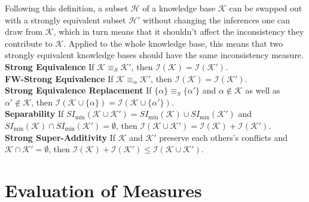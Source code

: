 Following this definition, a subset \(\mathcal{H}\) of a knowledge base \(\mathcal{K}\) can be swapped out with a strongly equivalent subset \(\mathcal{H}'\) without changing the inferences one can draw from \(\mathcal{K}\), which in turn means that it shouldn't affect the inconsistency they contribute to \(\mathcal{K}\). Applied to the whole knowledge base, this means that two strongly equivalent knowledge bases should have the same inconsistency measure.
\\
\textbf{Strong Equivalence}
If \(\mathcal{K} \equiv_S \mathcal{K}'\), then \(\mathcal{I}(\mathcal{K}) = \mathcal{I}(\mathcal{K}')\).
\\
\textbf{FW-Strong Equivalence}
If \(\mathcal{K} \equiv_{\alpha} \mathcal{K}'\), then \(\mathcal{I}(\mathcal{K}) = \mathcal{I}(\mathcal{K}')\).
\\
\textbf{Strong Equivalence Replacement}
If \(\{\alpha\} \equiv_S \{\alpha'\}\) and \(\alpha \notin \mathcal{K}\) as well as \(\alpha' \notin \mathcal{K}\), then \(\mathcal{I}(\mathcal{K} \cup \{\alpha\}) = \mathcal{I}(\mathcal{K} \cup \{\alpha'\})\).
\\
\textbf{Separability}
If \(SI_{\min}(\mathcal{K} \cup \mathcal{K}') = SI_{\min}(\mathcal{K}) \cup SI_{\min}(\mathcal{K}')\) and \(SI_{\min}(\mathcal{K}) \cap SI_{\min}(\mathcal{K}') = \emptyset\), then \(\mathcal{I}(\mathcal{K} \cup \mathcal{K}') = \mathcal{I}(\mathcal{K}) + \mathcal{I}(\mathcal{K}')\).
\\
\textbf{Strong Super-Additivity}
If \(\mathcal{K}\) and \(\mathcal{K}'\) preserve each others's conflicts and \(\mathcal{K} \cap \mathcal{K}' = \emptyset\), then \(\mathcal{I}(\mathcal{K}) + \mathcal{I}(\mathcal{K'}) \leq \mathcal{I}(\mathcal{K} \cup \mathcal{K}')\).

\section{Evaluation of Measures}
